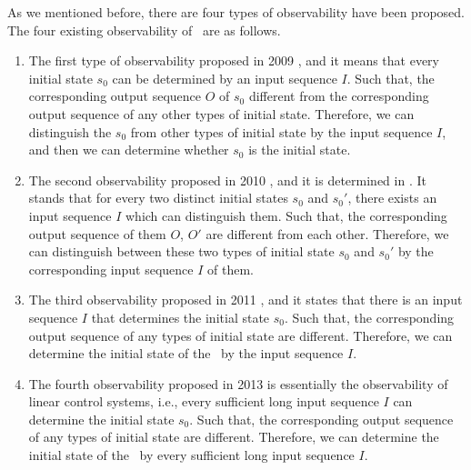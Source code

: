 As we mentioned before, there are four types of observability have been proposed. The four existing observability of \BCNs\ are as follows.
\begin{enumerate}
	\item The first type of observability proposed in 2009 \cite{cheng2009controllability}, and it means that every initial state $s_0$ can be determined by an input sequence $I$. Such that, the corresponding output sequence $O$ of $s_0$ different from the corresponding output sequence of any other types of initial state. Therefore, we can distinguish the $s_0$ from other types of initial state by the input sequence $I$, and then we can determine whether $s_0$ is the initial state.
	\item 
	The second observability proposed in 2010 \cite{Zhao2010Input}, and it is determined in \cite{Li2015Controllability}. It stands that for every two distinct initial states $s_0$ and $s_0'$, there exists an input sequence $I$ which can distinguish them. Such that, the corresponding output sequence of them $O$, $O'$ are different from each other. Therefore, we can distinguish between these two types of initial state $s_0$ and $s_0'$ by the corresponding input sequence $I$ of them.	
	\item The third observability proposed in 2011 \cite{Cheng2011Identification}, and it states that there is an input sequence $I$ that determines the initial state $s_0$. Such that, the corresponding output sequence of any types of initial state are different. Therefore, we can determine the initial state of the \BCN\ by the input sequence $I$.
	
	\item  The fourth observability proposed in 2013 \cite{Fornasini2013Observability} is essentially the observability of linear control systems, i.e., every sufficient long input sequence $I$ can determine the initial state $s_0$. Such that, the corresponding output sequence of any types of initial state are different. Therefore, we can determine the initial state of the \BCN\ by every sufficient long input sequence $I$.
\end{enumerate}
 

